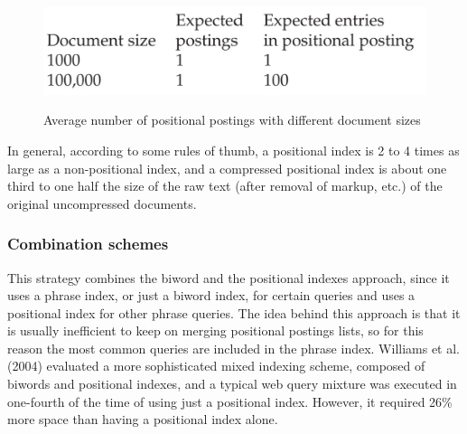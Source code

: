 \begin{figure}[h!]
		\centering
		\includegraphics[scale = 0.8]{img/space positional indexes.jpg}
		\label{space_pos_index}
        \caption{Average number of positional postings with different document sizes}
\end{figure}

In general, according to some rules of thumb, a positional index is 2 to 4 times as large as a non-positional index, and a compressed positional index is about one third to one half the size of the raw text (after removal of markup, etc.) of the original uncompressed documents.

\subsubsection{Combination schemes}
This strategy combines the biword and the positional indexes approach, since it uses a phrase index, or just a biword index, for certain queries and uses a positional index for other phrase queries. The idea behind this approach is that it is usually inefficient to keep on merging positional postings lists, so for this reason the most common queries are included in the phrase index. Williams et al. (2004) evaluated a more sophisticated mixed indexing scheme, composed of biwords and positional indexes, and a typical web query mixture was executed in one-fourth of the time of using just a positional index. However, it required 26\% more space than having a positional index alone.

